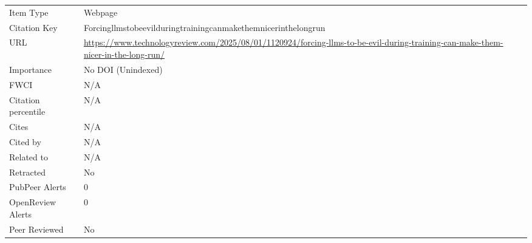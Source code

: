 \documentclass{article}
\begin{document}
\begin{enumerate}[label=\arabic*., font=\Large]
\begin{longtable}{p{} p{\contentcolwidth-2\tabcolsep}}
\toprule
Item Type & Webpage \\
Citation Key & Forcingllmstobeevilduringtrainingcanmakethemnicerinthelongrun \\
URL & \url{https://www.technologyreview.com/2025/08/01/1120924/forcing-llms-to-be-evil-during-training-can-make-them-nicer-in-the-long-run/} \\
Importance & No DOI (Unindexed) \\
FWCI & N/A \\
Citation percentile & N/A \\
Cites & N/A \\
Cited by & N/A \\
Related to & N/A \\
Retracted & No \\
PubPeer Alerts & 0 \\
OpenReview Alerts & 0 \\
Peer Reviewed & No \\
\bottomrule
\end{longtable}

\end{enumerate}
\end{document}
